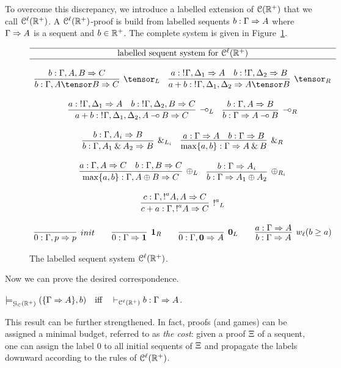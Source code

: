 To overcome this discrepancy, we introduce a  labelled extension of $\mathcal{C}(\mathbb{R}^+)$ that we call $\mathcal{C}^\ell(\mathbb{R}^+)$. A $\mathcal{C}^\ell(\mathbb{R}^+)$-proof is build from labelled sequents $b: \Gamma\Rightarrow A$ where $\Gamma\Rightarrow A$ is a sequent and $b\in\mathbb{R}^+$. The complete system is given in Figure~\ref{fig:lll}. 
\begin{figure}[t]
{
\[
\begin{array}{c}
\hline\mbox{labelled sequent system for }\laIMALLR\\\hline\\
 \infer[\tensor_L]{b: \Gamma, A \tensor B \seq C}
{b: \Gamma, A, B \seq C} 
\quad 
\infer[\tensor_R]{a+b:\nbang{}\Gamma,\Delta_1, \Delta_2 \seq A\tensor B}
{a:\nbang{}\Gamma,\Delta_1 \seq A & b:\nbang{}\Gamma,\Delta_2 \seq B}
\\\\
\infer[\lolli_L]{a+b:\nbang{}\Gamma,\Delta_1, \Delta_2, A \lolli B \seq C}
{a:\nbang{}\Gamma,\Delta_1 \seq A & b:\nbang{}\Gamma,\Delta_2, B \seq C}
\quad 
\infer[\lolli_R]{b:\Gamma \seq A \lolli B}{b:\Gamma, A \seq B}
\\\\
 \infer[\with_{L_i}]{b:\Gamma, A_1 \with A_2 \seq B}
{b:\Gamma, A_i\seq B} 
\quad 
\infer[\with_R]{\max\{a,b\}: \Gamma \seq A \with B}
{a:\Gamma \seq A & b:\Gamma \seq B}
\\\\
\infer[\oplus_L]{\max\{a,b\}:\Gamma, A \oplus B \seq C}
{a:\Gamma, A \seq C & b:\Gamma, B \seq C}
\quad 
\infer[\oplus_{R_i}]{b:\Gamma \seq A_1 \oplus A_2}{b:\Gamma \seq A_i}
\\\\
\infer[\nbang{a}_L]{c+a:\Gamma,\nbang{a}A\seq C}{c:\Gamma,\nbang{a}A,A\seq C}
\\\\
  \infer[init]{0:\Gamma,p \seq p}{} 
 \qquad
\infer[\one_R]{0:\Gamma \seq \one}{}
\qquad 
\infer[\zero_L]{0: \Gamma,\zero\seq A}{}
\qquad 
\infer[w_{\ell} (b\geq a)]{b: \Gamma\seq A}{a:\Gamma\seq A}
\end{array}
\]}\caption{The labelled sequent system $\mathcal{C}^\ell(\mathbb{R}^+)$.}
\label{fig:lll}
\end{figure}
Now we can  prove the desired correspondence.
\begin{theorem}
\label{theorem:adeq2}
$\models^{}_{\mathcal{G}_{\mathcal{C}}(\mathbb{R}^+)}(\{\Gamma\Rightarrow A\},b)\quad\mbox{iff}\quad\vdash_{\mathcal{C}^\ell(\mathbb{R}^+)}b: \Gamma\Rightarrow A$. 
\end{theorem}
This result can be further strengthened. In fact, proofs (and games) can be assigned a minimal budget, referred to as {\em the cost}: given a proof $\Xi$ of a sequent, one can assign the label $0$ to all initial sequents of $\Xi$ and propagate the labels downward according to the rules of $\mathcal{C}^\ell(\mathbb{R}^+)$.
